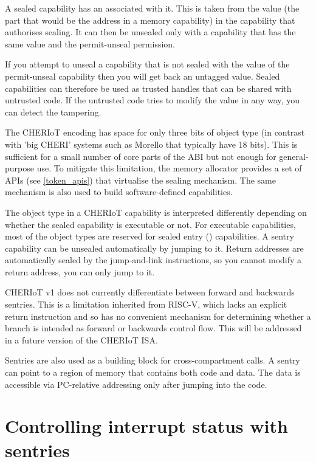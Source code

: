A sealed capability has an  associated with it.
This is taken from the value (the part that would be the address in a memory capability) in the capability that authorises sealing.
It can then be unsealed only with a capability that has the same value and the permit-unseal permission.

If you attempt to unseal a capability that is not sealed with the value of the permit-unseal capability then you will get back an untagged value.
Sealed capabilities can therefore be used as trusted handles that can be shared with untrusted code.
If the untrusted code tries to modify the value in any way, you can detect the tampering.

The CHERIoT encoding has space for only three bits of object type (in contrast with 'big CHERI' systems such as Morello that typically have 18 bits).
This is sufficient for a small number of core parts of the ABI but not enough for general-purpose use.
To mitigate this limitation, the memory allocator provides a set of APIs (see \ref{token_apis}) that virtualise the sealing mechanism.
The same mechanism is also used to build software-defined capabilities.

The object type in a CHERIoT capability is interpreted differently depending on whether the sealed capability is executable or not.
For executable capabilities, most of the object types are reserved for sealed entry () capabilities.
A sentry capability can be unsealed automatically by jumping to it.
Return addresses are automatically sealed by the jump-and-link instructions, so you cannot modify a return address, you can only jump to it.

\begin{note}
CHERIoT v1 does not currently differentiate between forward and backwards sentries.
This is a limitation inherited from RISC-V, which lacks an explicit return instruction and so has no convenient mechanism for determining whether a branch is intended as forward or backwards control flow.
This will be addressed in a future version of the CHERIoT ISA.
\end{note}

Sentries are also used as a building block for cross-compartment calls.
A sentry can point to a region of memory that contains both code and data.
The data is accessible via PC-relative addressing only after jumping into the code.

\section{Controlling interrupt status with sentries}

